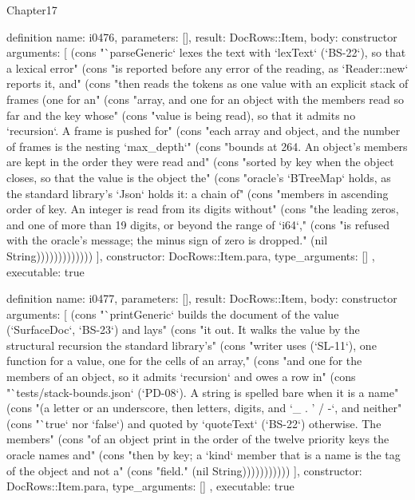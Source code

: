\begin{lexlean}{Chapter17}
\begin{semanticmodule}
definition{
  name: i0476,
  parameters: [],
  result: DocRows::Item,
  body: constructor{
    arguments: [
      (cons "`parseGeneric` lexes the text with `lexText` (`BS-22`), so that a lexical error" (cons "is reported before any error of the reading, as `Reader::new` reports it, and" (cons "then reads the tokens as one value with an explicit stack of frames (one for an" (cons "array, and one for an object with the members read so far and the key whose" (cons "value is being read), so that it admits no `recursion`. A frame is pushed for" (cons "each array and object, and the number of frames is the nesting `max_depth`" (cons "bounds at 264. An object's members are kept in the order they were read and" (cons "sorted by key when the object closes, so that the value is the object the" (cons "oracle's `BTreeMap` holds, as the standard library's `Json` holds it: a chain of" (cons "members in ascending order of key. An integer is read from its digits without" (cons "the leading zeros, and one of more than 19 digits, or beyond the range of `i64`," (cons "is refused with the oracle's message; the minus sign of zero is dropped." (nil String)))))))))))))
    ],
    constructor: DocRows::Item.para,
    type_arguments: []
  },
  executable: true
}

definition{
  name: i0477,
  parameters: [],
  result: DocRows::Item,
  body: constructor{
    arguments: [
      (cons "`printGeneric` builds the document of the value (`SurfaceDoc`, `BS-23`) and lays" (cons "it out. It walks the value by the structural recursion the standard library's" (cons "writer uses (`SL-11`), one function for a value, one for the cells of an array," (cons "and one for the members of an object, so it admits `recursion` and owes a row in" (cons "`tests/stack-bounds.json` (`PD-08`). A string is spelled bare when it is a name" (cons "(a letter or an underscore, then letters, digits, and `_ . ' / -`, and neither" (cons "`true` nor `false`) and quoted by `quoteText` (`BS-22`) otherwise. The members" (cons "of an object print in the order of the twelve priority keys the oracle names and" (cons "then by key; a `kind` member that is a name is the tag of the object and not a" (cons "field." (nil String)))))))))))
    ],
    constructor: DocRows::Item.para,
    type_arguments: []
  },
  executable: true
}


\end{semanticmodule}
\end{lexlean}

